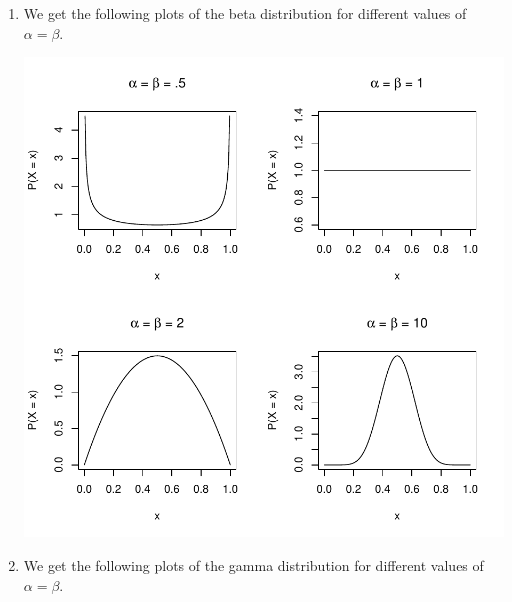 \documentclass[12pt]{article}\usepackage[]{graphicx}\usepackage[]{color}
\makeatletter
\def\maxwidth{ %
  \ifdim\Gin@nat@width>\linewidth
    \linewidth
  \else
    \Gin@nat@width
  \fi
}
\newenvironment{knitrout}{}{} %
\makeatother
\begin{document}
\begin{enumerate}
\item We get the following plots of the beta distribution for different values of $\alpha = \beta$.

\begin{knitrout}
\color{fgcolor}

{\centering \includegraphics[width=\maxwidth]{figure/plot6-1} 

}



\end{knitrout}

\item We get the following plots of the gamma distribution for different values of $\alpha = \beta$.

\begin{knitrout}
\color{fgcolor}


\end{knitrout}
\end{enumerate}
\end{document}

